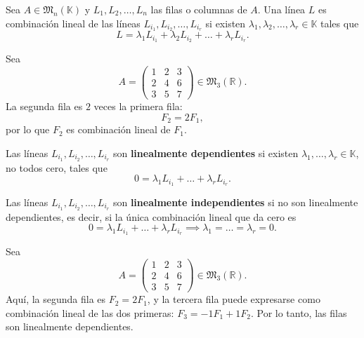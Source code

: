 \documentclass[a4paper,12pt]{article}
\begin{document}
\begin{procedimiento}[title=Propiedades del determinante]
\begin{enumerate}
\end{enumerate}
\end{procedimiento}

\begin{procedimiento}[title=Combinación lineal de líneas]
Sea $A \in \mathfrak{M}_n(\mathbb{K})$ y $L_1, L_2, \dots, L_n$ las filas o columnas de $A$.  
Una línea $L$ es combinación lineal de las líneas $L_{i_1}, L_{i_2}, \dots, L_{i_r}$ si existen 
$\lambda_1, \lambda_2, \dots, \lambda_r \in \mathbb{K}$ tales que
\[
L = \lambda_1 L_{i_1} + \lambda_2 L_{i_2} + \dots + \lambda_r L_{i_r}.
\]
\end{procedimiento}

\begin{ejemplo}[title=Ejemplo de combinación lineal de líneas]
Sea
\[
A =
\begin{pmatrix}
1 & 2 & 3 \\
2 & 4 & 6 \\
3 & 5 & 7
\end{pmatrix} \in \mathfrak{M}_3(\mathbb{R}).
\]
La segunda fila es $2$ veces la primera fila:
\[
F_2 = 2 F_1,
\]
por lo que $F_2$ es combinación lineal de $F_1$.
\end{ejemplo}

\begin{procedimiento}[title=(In)dependencia lineal]
Las líneas $L_{i_1}, L_{i_2}, \dots, L_{i_r}$ son \textbf{linealmente dependientes} si existen 
$\lambda_1, \dots, \lambda_r \in \mathbb{K}$, no todos cero, tales que
\[
0 = \lambda_1 L_{i_1} + \dots + \lambda_r L_{i_r}.
\]

Las líneas $L_{i_1}, L_{i_2}, \dots, L_{i_r}$ son \textbf{linealmente independientes} si no son linealmente dependientes, es decir, si la única combinación lineal que da cero es
\[
0 = \lambda_1 L_{i_1} + \dots + \lambda_r L_{i_r} \implies \lambda_1 = \dots = \lambda_r = 0.
\]
\end{procedimiento}

\begin{ejemplo}[title=Ejemplo de líneas linealmente dependientes]
Sea
\[
A =
\begin{pmatrix}
1 & 2 & 3 \\
2 & 4 & 6 \\
3 & 5 & 7
\end{pmatrix} \in \mathfrak{M}_3(\mathbb{R}).
\]
Aquí, la segunda fila es $F_2 = 2 F_1$, y la tercera fila puede expresarse como combinación lineal de las dos primeras: $F_3 = -1 F_1 + 1 F_2$.  
Por lo tanto, las filas son linealmente dependientes.
\end{ejemplo}
\end{document}

